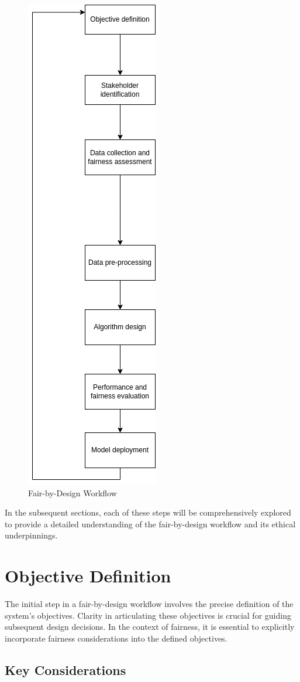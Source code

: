 \documentclass[12pt,a4paper,openright,twoside]{book}
\begin{document}
\begin{figure}[hp]
    \centering
    \includegraphics[width=.5\textwidth,height=1\textwidth]{final.png}
    \caption{Fair-by-Design Workflow}
\end{figure}

In the subsequent sections, each of these steps will be comprehensively explored to provide a detailed understanding of the fair-by-design workflow and its ethical underpinnings.

\section{Objective Definition}
\label{section:objective-definition}

The initial step in a fair-by-design workflow involves the precise definition of the system's objectives. Clarity in articulating these objectives is crucial for guiding subsequent design decisions. In the context of fairness, it is essential to explicitly incorporate fairness considerations into the defined objectives.

\subsection{Key Considerations}
\end{document}
